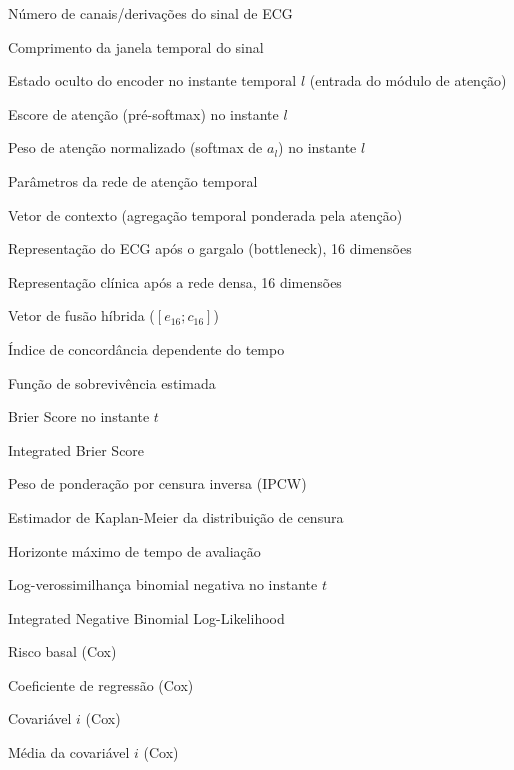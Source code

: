 \begin{simbolos}
	\item[$ C $] Número de canais/derivações do sinal de ECG
	\item[$ L $] Comprimento da janela temporal do sinal
	\item[$ h_l $] Estado oculto do encoder no instante temporal $l$ (entrada do módulo de atenção)
	\item[$ a_l $] Escore de atenção (pré-softmax) no instante $l$
	\item[$ w_l $] Peso de atenção normalizado (softmax de $a_l$) no instante $l$
	\item[$ v, W_1, b_1 $] Parâmetros da rede de atenção temporal
	\item[$ v_{ctx} $] Vetor de contexto (agregação temporal ponderada pela atenção)
	\item[$ e_{16} $] Representação do ECG após o gargalo (bottleneck), 16 dimensões
	\item[$ c_{16} $] Representação clínica após a rede densa, 16 dimensões
	\item[$ f $] Vetor de fusão híbrida ($[e_{16}; c_{16}]$)

	\item[$ C_{td} $] Índice de concordância dependente do tempo
	\item[$ \hat{S}(t\,|\,x) $] Função de sobrevivência estimada
	\item[$ BS(t) $] Brier Score no instante $t$
	\item[$ IBS $] Integrated Brier Score
	\item[$ \hat{w}_i(t) $] Peso de ponderação por censura inversa (IPCW)
	\item[$ \hat{G}(t) $] Estimador de Kaplan-Meier da distribuição de censura
	\item[$ t_{max} $] Horizonte máximo de tempo de avaliação
	\item[$ NBLL(t) $] Log-verossimilhança binomial negativa no instante $t$
	\item[$ Int.\ NBLL $] Integrated Negative Binomial Log-Likelihood

	\item[$ b_0(t) $] Risco basal (Cox)
	\item[$ b_i $] Coeficiente de regressão (Cox)
	\item[$ x_i $] Covariável $i$ (Cox)
	\item[$ \bar{x}_i $] Média da covariável $i$ (Cox)

\end{simbolos}